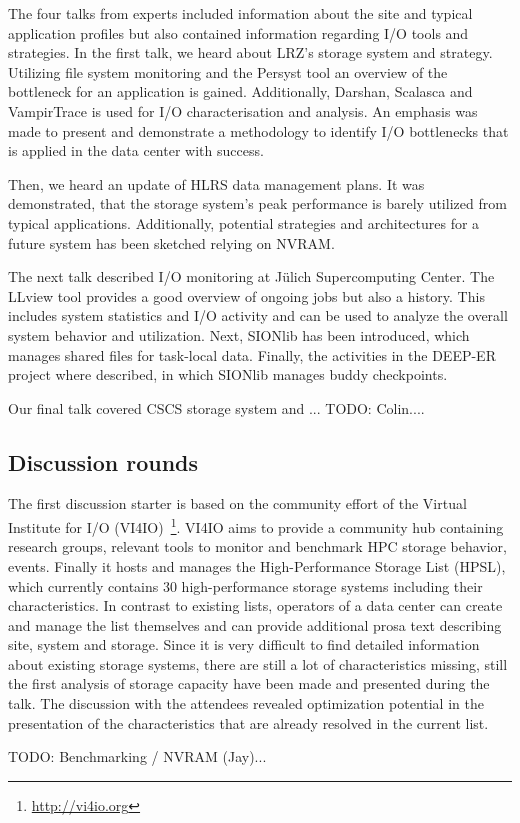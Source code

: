 \documentclass{llncs}
\begin{document}
The four talks from experts included information about the site and typical application profiles but also contained information regarding I/O tools and strategies. 
In the first talk, we heard about LRZ's storage system and strategy.
Utilizing file system monitoring and the Persyst tool an overview of the bottleneck for an application is gained.
Additionally, Darshan, Scalasca and VampirTrace is used for I/O characterisation and analysis.
An emphasis was made to present and demonstrate a methodology to identify I/O bottlenecks that is applied in the data center with success.

Then, we heard an update of HLRS data management plans.
It was demonstrated, that the storage system's peak performance is barely utilized from typical applications.
Additionally, potential strategies and architectures for a future system has been sketched relying on NVRAM.

The next talk described I/O monitoring at Jülich Supercomputing Center.
The LLview tool provides a good overview of ongoing jobs but also a history. 
This includes system statistics and I/O activity and can be used to analyze the overall system behavior and utilization.
Next, SIONlib has been introduced, which manages shared files for task-local data.
Finally, the activities in the DEEP-ER project where described, in which SIONlib manages buddy checkpoints.

Our final talk covered CSCS storage system and ...
TODO: Colin....


\subsection{Discussion rounds}


The first discussion starter is based on the community effort of the Virtual Institute for I/O (VI4IO)~\footnote{\url{http://vi4io.org}}.
VI4IO aims to provide a community hub containing research groups, relevant tools to monitor and benchmark HPC storage behavior, events. 
Finally it hosts and manages the High-Performance Storage List (HPSL), which currently contains 30 high-performance storage systems including their characteristics.
In contrast to existing lists, operators of a data center can create and manage the list themselves and can provide additional prosa text describing site, system and storage.
Since it is very difficult to find detailed information about existing storage systems, there are still a lot of characteristics missing, still the first analysis of storage capacity have been made and presented during the talk.
The discussion with the attendees revealed optimization potential in the presentation of the characteristics that are already resolved in the current list.

TODO: Benchmarking / NVRAM (Jay)...





\end{document}

